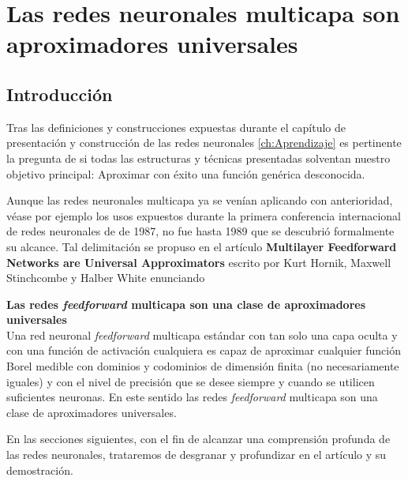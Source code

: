 %

\chapter{Las redes neuronales multicapa son aproximadores universales}  

\section{Introducción}  

Tras las definiciones y construcciones expuestas durante el capítulo de presentación 
y construcción de las redes neuronales  \ref{ch:Aprendizaje}
es pertinente la pregunta de si todas las estructuras y técnicas presentadas solventan nuestro 
objetivo principal: Aproximar
con éxito una función genérica desconocida.   

Aunque las redes neuronales multicapa ya se venían aplicando con anterioridad, 
véase por ejemplo los usos expuestos durante la primera conferencia
internacional de redes neuronales de \cite{4307059} de 1987, 
no fue hasta 1989 que se descubrió formalmente su alcance.
 Tal delimitación se propuso en el artículo 
\textbf{Multilayer Feedforward Networks are Universal Approximators} \cite{HORNIK1989359}
 escrito por Kurt Hornik, Maxwell Stinchcombe y Halber White enunciando 

\begin{teorema}\textbf{Las redes \textit{feedforward} multicapa son una clase de aproximadores universales } \label{teo:MFNAUA}
    \\
    Una red neuronal \textit{feedforward} multicapa estándar con tan solo una capa oculta y con una función de activación cualquiera es capaz de aproximar cualquier 
    función Borel medible  con dominios y codominios de dimensión finita (no necesariamente iguales) y con el nivel de precisión que se desee siempre y cuando 
    se utilicen suficientes neuronas. En este sentido las redes \textit{feedforward} multicapa son una clase de aproximadores universales.

\end{teorema}

En las secciones siguientes, con el fin de alcanzar una comprensión profunda de las redes neuronales,
trataremos de desgranar y profundizar en el artículo y su demostración. 

